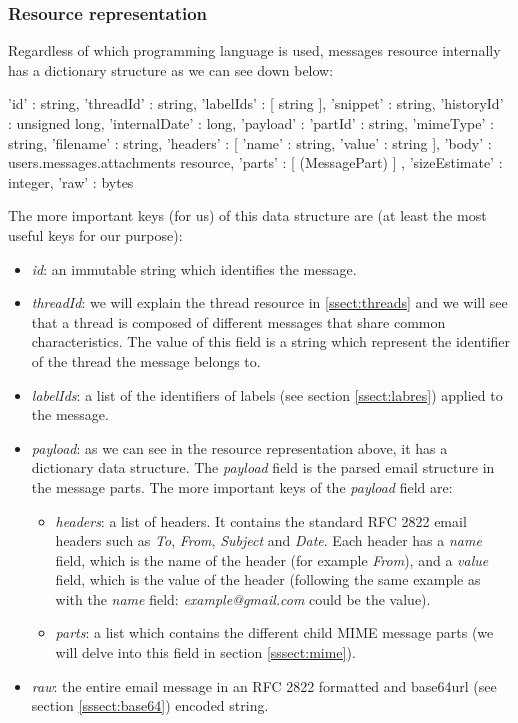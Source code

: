 \subsubsection{Resource representation}\label{sssect:msgresrep}

Regardless of which programming language is used, messages resource \citep[/v1/reference/users/messages]{gmailAPI} internally has a dictionary structure as we can see down below:

\begin{python}
{
'id' : string,
'threadId' : string,
'labelIds' : [ string ],
'snippet' : string,
'historyId' : unsigned long,
'internalDate' : long,
'payload' : {
	'partId' : string,
	'mimeType' : string,
	'filename' : string,
	'headers' : [
		{
		'name' : string,
		'value' : string
		}
	],
	'body' : users.messages.attachments resource,
	'parts' : [ (MessagePart) ]
	},
'sizeEstimate' : integer,
'raw' : bytes
}
\end{python}

The more important keys (for us) of this data structure are (at least the most useful keys for our purpose):
\begin{itemize}
	\item\textit{id}: an immutable string which identifies the message.
	\item\textit{threadId}: we will explain the thread resource in \ref{ssect:threads} and we will see that a thread is composed of different messages that share common characteristics. The value of this field is a string which represent the identifier of the thread the message belongs to.
	\item\textit{labelIds}: a list of the identifiers of labels (see section \ref{ssect:labres}) applied to the message.
	\item\textit{payload}: as we can see in the resource representation above, it has a dictionary data structure. The \textit{payload} field is the parsed email structure in the message parts. The more important keys of the \textit{payload} field are:
	\begin{itemize}
		\item\textit{headers}: a list of headers. It contains the standard RFC 2822 \citep{rfc2822} email headers such as \textit{To}, \textit{From}, \textit{Subject} and \textit{Date}. Each header has a \textit{name} field, which is the name of the header (for example \textit{From}), and a \textit{value} field, which is the value of the header (following the same example as with the \textit{name} field: \textit{example@gmail.com} could be the value).
		\item\textit{parts}: a list which contains the different child MIME message parts (we will delve into this field in section \ref{sssect:mime}).
	\end{itemize}
	\item\textit{raw}: the entire email message in an RFC 2822 \citep{rfc2822} formatted and base64url (see section \ref{sssect:base64}) encoded string.
\end{itemize}


